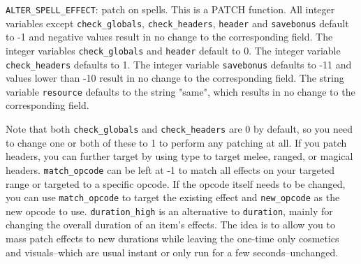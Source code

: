\documentclass{article}
\begin{document}
\verb+ALTER_SPELL_EFFECT+: patch  on spells. This is a PATCH function. All integer variables except \verb+check_globals+, \verb+check_headers+, \verb+header+ and \verb+savebonus+ default to -1 and negative values result in no change to the corresponding field. The integer variables \verb+check_globals+ and \verb+header+ default to 0. The integer variable \verb+check_headers+ defaults to 1. The integer variable \verb+savebonus+ defaults to -11 and values lower than -10 result in no change to the corresponding field. The string variable \verb+resource+ defaults to the string "same", which results in no change to the corresponding field.

Note that both \verb+check_globals+ and \verb+check_headers+ are 0 by default, so you need to change one or both of these to 1 to perform any patching at all. If you patch headers, you can further target by using type to target melee, ranged, or magical headers. \verb+match_opcode+ can be left at -1 to match all effects on your targeted range or targeted to a specific opcode. If the opcode itself needs to be changed, you can use \verb+match_opcode+ to target the existing effect and \verb+new_opcode+ as the new opcode to use. \verb+duration_high+ is an alternative to \verb+duration+, mainly for changing the overall duration of an item's effects. The idea is to allow you to mass patch effects to new durations while leaving the one-time only cosmetics and visuals--which are usual instant or only run for a few seconds--unchanged.
\end{document}
